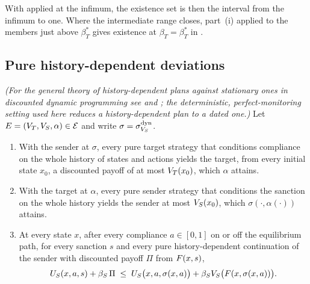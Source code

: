 With  applied at the infimum, the existence set is then
the interval from the infimum to one. Where the intermediate range closes, part~(i) applied to the members
just above $\beta_T^*$ gives existence at $\beta_T=\beta_T^*$ in .

\subsection{Pure history-dependent deviations}
\label{app:proofs:history}

\begin{proposition}
\label{prop:history-deviations}
\emph{(For the general theory of history-dependent plans against stationary
ones in discounted dynamic programming see \citet{Strauch1966} and
\citet{Denardo1967}; the deterministic, perfect-monitoring setting used here
reduces a history-dependent plan to a dated one.)}
Let $E=(V_T,V_S,\alpha)\in\mathcal E$ and write
$\sigma=\sigma^{\mathrm{dyn}}_{V_S}$.
\begin{enumerate}[label=(\roman*)]
\item With the sender at $\sigma$, every pure target strategy that conditions
compliance on the whole history of states and actions yields the target, from
every initial state $x_0$, a discounted payoff of at most $V_T(x_0)$, which
$\alpha$ attains.
\item With the target at $\alpha$, every pure sender strategy that conditions
the sanction on the whole history yields the sender at most $V_S(x_0)$, which
$\sigma(\cdot,\alpha(\cdot))$ attains.
\item At every state $x$, after every compliance $a\in[0,1]$ on or off the
equilibrium path, for every sanction $s$ and every pure history-dependent
continuation of the sender with discounted payoff $\Pi$ from $F(x,s)$,
\[
U_S(x,a,s)+\beta_S\,\Pi\;\le\;U_S\bigl(x,a,\sigma(x,a)\bigr)
+\beta_SV_S\bigl(F(x,\sigma(x,a))\bigr).
\]
\end{enumerate}
\end{proposition}

